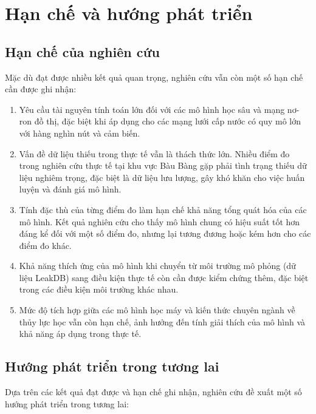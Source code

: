 \section{Hạn chế và hướng phát triển}

\subsection{Hạn chế của nghiên cứu}

Mặc dù đạt được nhiều kết quả quan trọng, nghiên cứu vẫn còn một số hạn chế cần được ghi nhận:

\begin{enumerate}
    \item Yêu cầu tài nguyên tính toán lớn đối với các mô hình học sâu và mạng nơ-ron đồ thị, đặc biệt khi áp dụng cho các mạng lưới cấp nước có quy mô lớn với hàng nghìn nút và cảm biến.
    
    \item Vấn đề dữ liệu thiếu trong thực tế vẫn là thách thức lớn. Nhiều điểm đo trong nghiên cứu thực tế tại khu vực Bàu Bàng gặp phải tình trạng thiếu dữ liệu nghiêm trọng, đặc biệt là dữ liệu lưu lượng, gây khó khăn cho việc huấn luyện và đánh giá mô hình.
    
    \item Tính đặc thù của từng điểm đo làm hạn chế khả năng tổng quát hóa của các mô hình. Kết quả nghiên cứu cho thấy mô hình chung có hiệu suất tốt hơn đáng kể đối với một số điểm đo, nhưng lại tương đương hoặc kém hơn cho các điểm đo khác.
    
    \item Khả năng thích ứng của mô hình khi chuyển từ môi trường mô phỏng (dữ liệu LeakDB) sang điều kiện thực tế còn cần được kiểm chứng thêm, đặc biệt trong các điều kiện môi trường khác nhau.
    
    \item Mức độ tích hợp giữa các mô hình học máy và kiến thức chuyên ngành về thủy lực học vẫn còn hạn chế, ảnh hưởng đến tính giải thích của mô hình và khả năng áp dụng trong thực tế.
\end{enumerate}

\subsection{Hướng phát triển trong tương lai}

Dựa trên các kết quả đạt được và hạn chế ghi nhận, nghiên cứu đề xuất một số hướng phát triển trong tương lai:

